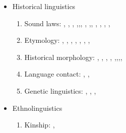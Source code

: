 \documentclass[oldfontcommands,oneside,a4paper,11pt]{article}
\begin{document}
\begin{itemize}
\item Historical linguistics
\begin{enumerate}
\item Sound laws:  \citet{jacques00ywij}, \citet{jacques01dg}, \citet{jacques03dissimilation},   \citet{jacques04thimphu},\citet{jacques06comparaison},\citet{jacques09wazur}, \citet{jacques09e}, \citet{michaud10bonin},\citet{jacques10ndr}, \citet{jacques.michaud11naish},   \citet{rg-gj12yod}, \citet{jacques13arapaho}, \citet{jacques13yod}, \citet{jacques14snom}
\item  Etymology:    \citet{jacques07naksatram}, \citet{jacques08debther}, \citet{jacques09zz}, \citet{jacques10imperial}, \citet{jacques11ngwemi}, \citet{jacques12bear},  \citet{jacques13vama},
\item Historical morphology:  \citet{jacques03s.houzhui}, \citet{jacques06morpho}, \citet{jacques07chang},    \citet{jacques09tangutverb}, \citet{jacques10zos},\citet{jacques11tangut.verb},\citet{jacques12agreement},\citet{jacques12internal}, \citet{jacques14antipassive}
\item Language contact: \citet{antonov12kumush},   \citet{jacques12bear},
\item Genetic linguistics:  \citet{jacques07chang}, \citet{jacques12agreement}, \citet{jacques2012genetic},
\end{enumerate}
\item Ethnolinguistics
\begin{enumerate}
\item Kinship: \citet{jacques11kinship},  

\end{enumerate}
  
  
\end{itemize}




\end{document}
